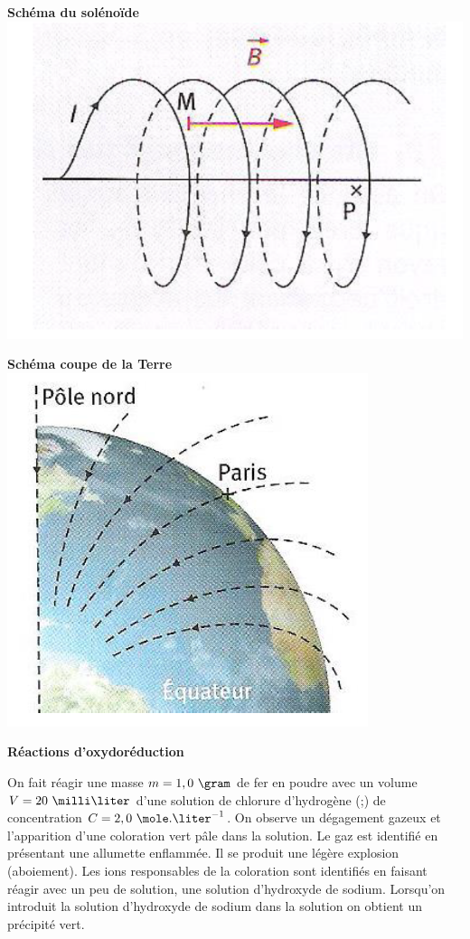 \begin{minipage}[c]{.46\linewidth}
\begin{center}
\textbf{Schéma du solénoïde}
\includegraphics[width=0.75\columnwidth]{images/Exo9_Solenoide}
\end{center}
\end{minipage}
\begin{minipage}[c]{.46\linewidth}
\begin{center}
\textbf{Schéma coupe de la Terre}
\includegraphics[width=0.5\columnwidth]{images/Exo9_Schema_Coupe_Terre}
\end{center}
\end{minipage}

\vspace{0.3cm}

\exo \textbf{Réactions d'oxydoréduction}

\vspace{0.3cm}

On fait réagir une masse $m=1,0\text{ }\gram$ de fer en poudre avec un volume $V=20\text{ }\milli\liter$ d'une solution de chlorure
d'hydrogène (;) de concentration $C=2,0\text{ }\mole.\liter^{-1}$. On observe un dégagement gazeux et l'apparition
d'une coloration vert pâle dans la solution.\newline
Le gaz est identifié en présentant une allumette enflammée. Il se produit une légère explosion (aboiement). Les ions responsables de la coloration sont identifiés en faisant réagir avec un peu de solution, une solution
d'hydroxyde de sodium. Lorsqu'on introduit la solution d'hydroxyde de sodium dans la solution on obtient un précipité vert.

